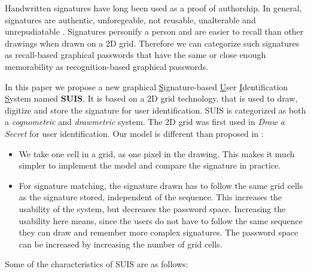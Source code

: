 \documentclass[conference]{IEEEtran}
\begin{document}
Handwritten signatures have long been used as a proof of authorship. In general, signatures are authentic, unforegeable, not reusable, unalterable and unrepudiatable \cite{signature-gp}. Signatures personify a person and are easier to recall than other drawings when drawn on a 2D grid. Therefore we can categorize such signatures as recall-based graphical passwords that have the same or close enough memorability as recognition-based graphical passwords.

In this paper we propose a new graphical \underline{S}ignature-based \underline{U}ser \underline{I}dentification \underline{S}ystem named \textbf{SUIS}. It is based on a 2D grid technology, that is used to draw, digitize and store the signature for user identification. SUIS is categorized as both a \emph{cognometric} and \emph{drawmetric} system. The 2D grid was first used in \emph{Draw a Secret} \cite{DAS} for user identification. Our model is different than proposed in \cite{DAS}:


\begin{itemize}
\item
We take one cell in a grid, as one pixel in the drawing. This makes it much simpler to implement the model and compare the signature in practice.
\item
For signature matching, the signature drawn has to follow the same grid cells as the signature stored, independent of the sequence. This increases the usability of the system, but decreases the password space. Increasing the usability here means, since the users do not have to follow the same sequence they can draw and remember more complex signatures. The password space can be increased by increasing the number of grid cells.
\end{itemize}

Some of the characteristics of SUIS are as follows:
\end{document}
